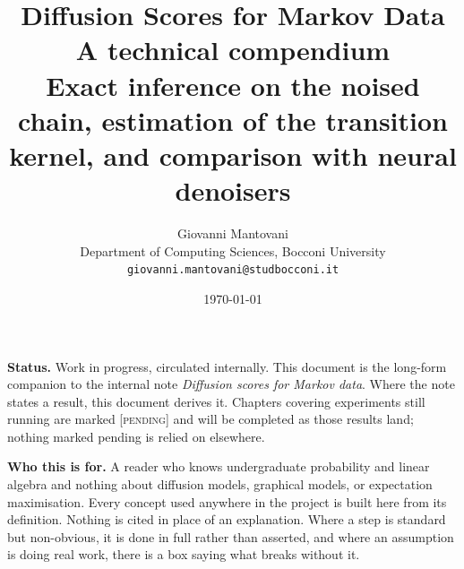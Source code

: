 \documentclass[11pt,a4paper]{report}
\title{\vspace{-2cm}\textbf{Diffusion Scores for Markov Data}\\[0.4em]
\Large A technical compendium\\[1.2em]
\large\normalfont Exact inference on the noised chain, estimation of the transition
kernel, and comparison with neural denoisers}
\author{Giovanni Mantovani\\
\small Department of Computing Sciences, Bocconi University\\
\small \texttt{giovanni.mantovani@studbocconi.it}}
\date{\today}
\theoremstyle{plain}
\theoremstyle{definition}
\theoremstyle{remark}
\begin{document}
\maketitle

\begin{center}
\begin{tcolorbox}[width=0.9\textwidth, colback=black!3, colframe=black!30]
\textbf{Status.} Work in progress, circulated internally. This document is the long-form
companion to the internal note \emph{Diffusion scores for Markov data}. Where the note states
a result, this document derives it. Chapters covering experiments still running are marked
\textsc{[pending]} and will be completed as those results land; nothing marked pending is
relied on elsewhere.
\end{tcolorbox}
\end{center}

\vspace{1em}

\begin{center}
\begin{minipage}{0.86\textwidth}
\small
\textbf{Who this is for.} A reader who knows undergraduate probability and linear algebra and
nothing about diffusion models, graphical models, or expectation maximisation. Every concept
used anywhere in the project is built here from its definition. Nothing is cited in place of
an explanation. Where a step is standard but non-obvious, it is done in full rather than
asserted, and where an assumption is doing real work, there is a box saying what breaks
without it.
\end{minipage}
\end{center}

\setcounter{tocdepth}{1}
\tableofcontents















\end{document}
